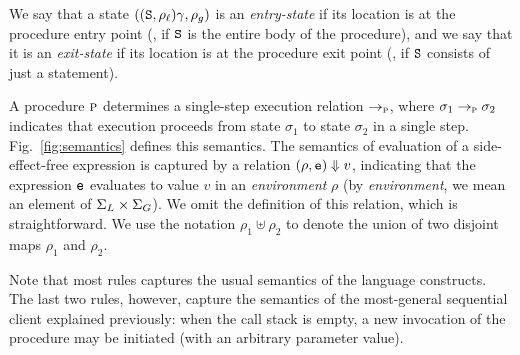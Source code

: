 We say that a state $((\texttt{S},\rho_\ell)\gamma,\rho_g)$ is an \emph{entry-state}
if its location is at 
the procedure entry point (\ie, if $\texttt{S}$ is the entire body of the procedure),
and we say that it is an \emph{exit-state} if its location is at the procedure exit point
(\ie, if $\texttt{S}$ consists of just a  statement).

A procedure $\textsc{p}$ determines a single-step execution relation
$\rightarrow_{\textsc{p}}$, where $\sigma_1 \rightarrow_{\textsc{p}} \sigma_2$ indicates that
execution proceeds from state $\sigma_1$ to state $\sigma_2$ in a single
step.  Fig.~\ref{fig:semantics} defines this semantics.  The semantics of
evaluation of a side-effect-free expression is captured by a relation
$({\rho},{\texttt{e}}) \Downarrow {v}$, indicating that the expression $\texttt{e}$
evaluates to value $v$ in an \emph{environment} $\rho$ (by
\emph{environment}, we mean an
element of $\Sigma_L \times \Sigma_G$).  We omit the definition of this
relation, which is straightforward.  We use the notation $\rho_1 \uplus
\rho_2$ to denote the union of two disjoint maps $\rho_1$ and $\rho_2$.


Note that most rules captures the usual semantics of the language constructs.
The last two rules, however, capture the semantics of the most-general sequential
client explained previously: when the call stack is empty, a new invocation of
the procedure may be initiated (with an arbitrary parameter value).


